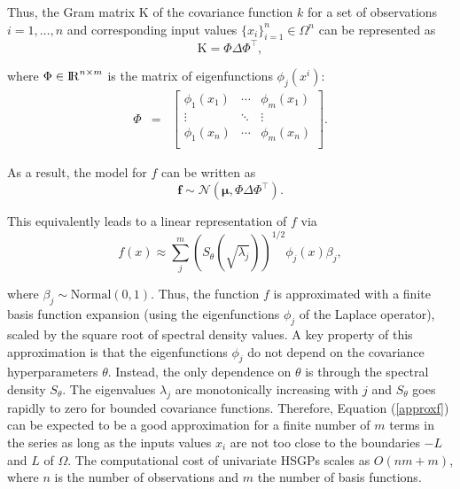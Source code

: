 \documentclass[]{interact}
\theoremstyle{plain}%
\theoremstyle{definition}
\theoremstyle{remark}
\begin{document}
Thus, the Gram matrix $\text{K}$ of the covariance function $k$ for a set of observations $i=1,\ldots,n$ and corresponding input values $\{x_i\}_{i=1}^{n} \in \Omega^{n}$ can be represented as
%
\begin{equation}
\text{K}= \Phi \Delta \Phi^\intercal, \nonumber
\end{equation}

\noindent where $\Phi \in {\rm I\!R}^{n\times m}$ is the matrix of eigenfunctions $\phi_j(x^i)$:
%
\begin{eqnarray}
\Phi &=&  \left[ {\begin{array}{ccc}
   \phi_1(x_1) & \cdots & \phi_m(x_1)  \\
    \vdots &\ddots & \vdots  \nonumber \\ 
    \phi_1(x_n) & \cdots & \phi_m(x_n) \\
  \end{array} } \right].
\end{eqnarray}
 
\noindent As a result, the model for $f$ can be written as
%
\begin{equation}
\mathbf{f} \sim \mathcal{N}(\boldsymbol{\mu},\Phi \Delta \Phi^\intercal). \nonumber
\end{equation}

\noindent This equivalently leads to a linear representation of $f$ via
%
\begin{equation}\label{approxf}
f(x) \approx \sum_{j}^m \left( S_{\theta}(\sqrt{\lambda_j})\right)^{1/2} \phi_j(x) \beta_j,
\end{equation}

\noindent where $\beta_j \sim \text{Normal}(0,1)$. Thus, the function $f$ is approximated with a finite basis function expansion (using the eigenfunctions $\phi_j$ of the Laplace operator), scaled by the square root of spectral density values. A key property of this approximation is that the eigenfunctions $\phi_j$ do not depend on the covariance hyperparameters $\theta$. Instead, the only dependence on $\theta$ is through the spectral density $S_{\theta}$. The eigenvalues $\lambda_j$ are monotonically increasing with $j$ and $S_{\theta}$ goes rapidly to zero for bounded covariance functions. Therefore, Equation (\ref{approxf}) can be expected to be a good approximation for a finite number of $m$ terms in the series as long as the inputs values $x_i$ are not too close to the boundaries $-L$ and $L$ of $\Omega$. The computational cost of univariate HSGPs scales as $O(nm + m)$, where $n$ is the number of observations and $m$ the number of basis functions.
\end{document}
